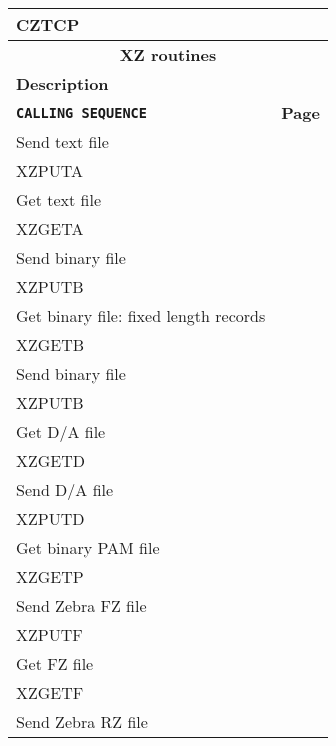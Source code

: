 \begin{longtable}{|l@{\qquad}r|}
\quad CZTCP                            & \pageref{CZTCP}    \\
\hline
\multicolumn{2}{|c|}{\bf XZ routines}                         \\
\hline
\bf Description               &                               \\
\tt\bf\quad CALLING SEQUENCE  & \bf Page                      \\
\hline
Send text file                           &                    \\
\quad XZPUTA                           &   \pageref{XZPUTA} \\
Get text file                            &                    \\
\quad XZGETA                           &   \pageref{XZGETA} \\
Send binary file                         &                    \\
\quad XZPUTB                           &   \pageref{XZPUTB} \\
Get binary file: fixed length records    &                    \\
\quad XZGETB                           &   \pageref{XZGETB} \\
Send binary file                         &                    \\
\quad XZPUTB                           &   \pageref{XZPUTB} \\
Get D/A file                             &                    \\
\quad XZGETD                           &   \pageref{XZGETB} \\
Send D/A file                            &                    \\
\quad XZPUTD                           &   \pageref{XZPUTP} \\
Get binary PAM file                      &                    \\
\quad XZGETP                           &   \pageref{XZGETP} \\
Send Zebra FZ file                       &                    \\
\quad XZPUTF                           &   \pageref{XZPUTF} \\
Get FZ file                              &                    \\
\quad XZGETF                           &   \pageref{XZGETF} \\
Send Zebra RZ file                       &                    \\

\end{longtable}
